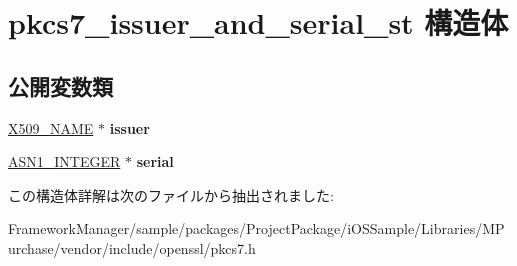 \hypertarget{structpkcs7__issuer__and__serial__st}{}\section{pkcs7\+\_\+issuer\+\_\+and\+\_\+serial\+\_\+st 構造体}
\label{structpkcs7__issuer__and__serial__st}
\subsection*{公開変数類}
\begin{DoxyCompactItemize}
\item 
\hypertarget{structpkcs7__issuer__and__serial__st_ace9f7a526b2d91328ce37a1b3d26c179}{}\hyperlink{struct_x509__name__st}{X509\+\_\+\+N\+A\+M\+E} $\ast$ {\bfseries issuer}\label{structpkcs7__issuer__and__serial__st_ace9f7a526b2d91328ce37a1b3d26c179}

\item 
\hypertarget{structpkcs7__issuer__and__serial__st_a46903221f3f9a3a0243bbaae23afbe98}{}\hyperlink{structasn1__string__st}{A\+S\+N1\+\_\+\+I\+N\+T\+E\+G\+E\+R} $\ast$ {\bfseries serial}\label{structpkcs7__issuer__and__serial__st_a46903221f3f9a3a0243bbaae23afbe98}

\end{DoxyCompactItemize}


この構造体詳解は次のファイルから抽出されました\+:\begin{DoxyCompactItemize}
\item 
Framework\+Manager/sample/packages/\+Project\+Package/i\+O\+S\+Sample/\+Libraries/\+M\+Purchase/vendor/include/openssl/pkcs7.\+h\end{DoxyCompactItemize}
